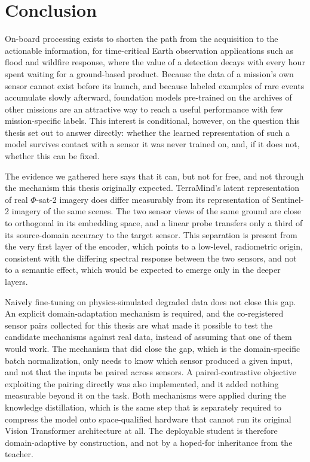 \chapter{Conclusion}
\label{chap:conclusion}

On-board processing exists to shorten the path from the acquisition to the actionable information, for time-critical Earth observation applications such as flood and wildfire response, where the value of a detection decays with every hour spent waiting for a ground-based product.
Because the data of a mission's own sensor cannot exist before its launch, and because labeled examples of rare events accumulate slowly afterward, foundation models pre-trained on the archives of other missions are an attractive way to reach a useful performance with few mission-specific labels.
This interest is conditional, however, on the question this thesis set out to answer directly: whether the learned representation of such a model survives contact with a sensor it was never trained on, and, if it does not, whether this can be fixed.

The evidence we gathered here says that it can, but not for free, and not through the mechanism this thesis originally expected.
TerraMind's latent representation of real $\Phi$-sat-2 imagery does differ measurably from its representation of Sentinel-2 imagery of the same scenes.
The two sensor views of the same ground are close to orthogonal in its embedding space, and a linear probe transfers only a third of its source-domain accuracy to the target sensor.
This separation is present from the very first layer of the encoder, which points to a low-level, radiometric origin, consistent with the differing spectral response between the two sensors, and not to a semantic effect, which would be expected to emerge only in the deeper layers.

Naively fine-tuning on physics-simulated degraded data does not close this gap.
An explicit domain-adaptation mechanism is required, and the co-registered sensor pairs collected for this thesis are what made it possible to test the candidate mechanisms against real data, instead of assuming that one of them would work.
The mechanism that did close the gap, which is the domain-specific batch normalization, only needs to know which sensor produced a given input, and not that the inputs be paired across sensors.
A paired-contrastive objective exploiting the pairing directly was also implemented, and it added nothing measurable beyond it on the  task.
Both mechanisms were applied during the knowledge distillation, which is the same step that is separately required to compress the model onto space-qualified hardware that cannot run its original Vision Transformer architecture at all.
The deployable student is therefore domain-adaptive by construction, and not by a hoped-for inheritance from the teacher.

